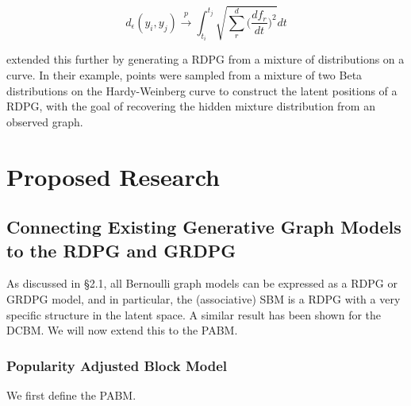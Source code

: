 \documentclass[
  11pt,
]{article}
\begin{document}
\begin{equation}
d_{\epsilon}(y_i, y_j) \stackrel{p}{\to} \int_{t_i}^{t_j} \sqrt{\sum_r^d \Big( \frac{d f_r}{d t} \Big)^2} dt
\end{equation}

\citet{athreya2020estimation} extended this further by generating a RDPG
from a mixture of distributions on a curve. In their example, points
were sampled from a mixture of two Beta distributions on the
Hardy-Weinberg curve to construct the latent positions of a RDPG, with
the goal of recovering the hidden mixture distribution from an observed
graph.

\hypertarget{proposed-research}{%
\section{Proposed Research}\label{proposed-research}}

\hypertarget{connecting-existing-generative-graph-models-to-the-rdpg-and-grdpg}{%
\subsection{Connecting Existing Generative Graph Models to the RDPG and
GRDPG}\label{connecting-existing-generative-graph-models-to-the-rdpg-and-grdpg}}

As discussed in \S 2.1, all Bernoulli graph models can be expressed as a
RDPG or GRDPG model, and in particular, the (associative) SBM is a RDPG
with a very specific structure in the latent space. A similar result has
been shown for the DCBM. We will now extend this to the PABM.

\hypertarget{popularity-adjusted-block-model}{%
\subsubsection{Popularity Adjusted Block
Model}\label{popularity-adjusted-block-model}}

We first define the PABM.
\end{document}
